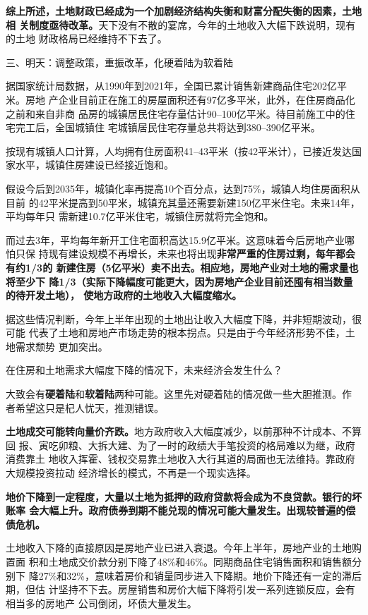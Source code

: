 \textbf{综上所述，土地财政已经成为一个加剧经济结构失衡和财富分配失衡的因素，土地相
  关制度亟待改革。}天下没有不散的宴席，今年的土地收入大幅下跌说明，现有的土地
财政格局已经维持不下去了。

{\heiti 三、明天：调整政策，重振改革，化硬着陆为软着陆}

据国家统计局数据，从1990年到2021年，全国已累计销售新建商品住宅202亿平米。房地
产企业目前正在施工的房屋面积还有97亿多平米，此外，在住房商品化之前和来自非商
品房的城镇居民住宅存量估计90--100亿平米。待目前施工中的住宅完工后，全国城镇住
宅城镇居民住宅存量总共将达到380--390亿平米。

按现有城镇人口计算，人均拥有住房面积41--43平米（按42平米计），已接近发达国家水平，城镇住房建设已经接近饱和。

假设今后到2035年，城镇化率再提高10个百分点，达到75\%，城镇人均住房面积从目前
的42平米提高到50平米，城镇充其量还需要新建150亿平米住宅。未来14年，平均每年只
需新建10.7亿平米住宅，城镇住房就将完全饱和。

而过去3年，平均每年新开工住宅面积高达15.9亿平米。这意味着今后房地产业哪怕只保
持现有建设规模不再增长，未来也将出现\textbf{非常严重的住房过剩，每年都会有约1/3的
新建住房（5亿平米）卖不出去。相应地，房地产业对土地的需求量也将至少下
降1/3（实际下降幅度可能更大，因为房地产企业目前还囤有相当数量的待开发土地），
使地方政府的土地收入大幅度缩水。}

据这些情况判断，今年上半年出现的土地出让收入大幅度下降，并非短期波动，很可能
代表了土地和房地产市场走势的根本拐点。只是由于今年经济形势不佳，土地需求颓势
更加突出。

在住房和土地需求大幅度下降的情况下，未来经济会发生什么？

大致会有\textbf{硬着陆}和\textbf{软着陆}两种可能。这里先对硬着陆的情况做一些大胆推测。作
者希望这只是杞人忧天，推测错误。

\textbf{土地成交可能转向量价齐跌。}地方政府收入大幅度减少，以前那种不计成本、不算回
报、寅吃卯粮、大拆大建、为了一时的政绩大手笔投资的格局难以为继，政府消费靠土
地收入挥霍、钱权交易靠土地收入大行其道的局面也无法维持。靠政府大规模投资拉动
经济增长的模式，不再是一个现实选择。

\textbf{地价下降到一定程度，大量以土地为抵押的政府贷款将会成为不良贷款。银行的坏账率
会大幅上升。政府债券到期不能兑现的情况可能大量发生。出现较普遍的偿债危机。}

土地收入下降的直接原因是房地产业已进入衰退。今年上半年，房地产业的土地购置面
积和土地成交价款分别下降了48\%和46\%。同期商品住宅销售面积和销售额分别下
降27\%和32\%，意味着房价和销量同步进入下降期。地价下降还有一定的滞后期，但估
计坚持不下去。房屋销售和房价大幅下降将引发一系列连锁反应，会有相当多的房地产
公司倒闭，坏债大量发生。

